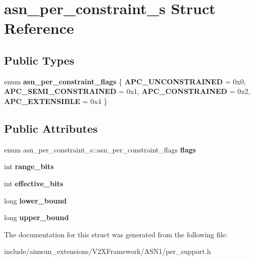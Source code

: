 \hypertarget{structasn__per__constraint__s}{}\section{asn\+\_\+per\+\_\+constraint\+\_\+s Struct Reference}
\label{structasn__per__constraint__s}
\subsection*{Public Types}
\begin{DoxyCompactItemize}
\item 
enum {\bfseries asn\+\_\+per\+\_\+constraint\+\_\+flags} \{ {\bfseries A\+P\+C\+\_\+\+U\+N\+C\+O\+N\+S\+T\+R\+A\+I\+N\+ED} = 0x0, 
{\bfseries A\+P\+C\+\_\+\+S\+E\+M\+I\+\_\+\+C\+O\+N\+S\+T\+R\+A\+I\+N\+ED} = 0x1, 
{\bfseries A\+P\+C\+\_\+\+C\+O\+N\+S\+T\+R\+A\+I\+N\+ED} = 0x2, 
{\bfseries A\+P\+C\+\_\+\+E\+X\+T\+E\+N\+S\+I\+B\+LE} = 0x4
 \}\hypertarget{structasn__per__constraint__s_a7e244d50a6fd6c915949ed844ac1b990}{}\label{structasn__per__constraint__s_a7e244d50a6fd6c915949ed844ac1b990}

\end{DoxyCompactItemize}
\subsection*{Public Attributes}
\begin{DoxyCompactItemize}
\item 
enum asn\+\_\+per\+\_\+constraint\+\_\+s\+::asn\+\_\+per\+\_\+constraint\+\_\+flags {\bfseries flags}\hypertarget{structasn__per__constraint__s_a842536a63e6ea5fe03efe6a6d3453681}{}\label{structasn__per__constraint__s_a842536a63e6ea5fe03efe6a6d3453681}

\item 
int {\bfseries range\+\_\+bits}\hypertarget{structasn__per__constraint__s_aededf9e836382738b542e560d9bb1e50}{}\label{structasn__per__constraint__s_aededf9e836382738b542e560d9bb1e50}

\item 
int {\bfseries effective\+\_\+bits}\hypertarget{structasn__per__constraint__s_a7f6e70444d737a7e4bb8099e07008445}{}\label{structasn__per__constraint__s_a7f6e70444d737a7e4bb8099e07008445}

\item 
long {\bfseries lower\+\_\+bound}\hypertarget{structasn__per__constraint__s_ab3d9a410fde0efb00412226ad51bccea}{}\label{structasn__per__constraint__s_ab3d9a410fde0efb00412226ad51bccea}

\item 
long {\bfseries upper\+\_\+bound}\hypertarget{structasn__per__constraint__s_ac114d50dfb41a04a9448777fc6ad4863}{}\label{structasn__per__constraint__s_ac114d50dfb41a04a9448777fc6ad4863}

\end{DoxyCompactItemize}


The documentation for this struct was generated from the following file\+:\begin{DoxyCompactItemize}
\item 
include/aimsun\+\_\+extensions/\+V2\+X\+Framework/\+A\+S\+N1/per\+\_\+support.\+h\end{DoxyCompactItemize}
